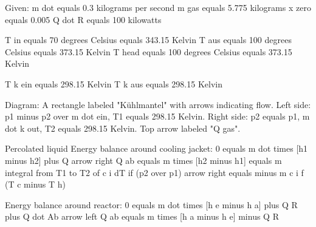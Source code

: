 Given:  
m dot equals 0.3 kilograms per second  
m gas equals 5.775 kilograms  
x zero equals 0.005  
Q dot R equals 100 kilowatts  

T in equals 70 degrees Celsius equals 343.15 Kelvin  
T aus equals 100 degrees Celsius equals 373.15 Kelvin  
T head equals 100 degrees Celsius equals 373.15 Kelvin  

T k ein equals 298.15 Kelvin  
T k aus equals 298.15 Kelvin  

Diagram:  
A rectangle labeled "Kühlmantel" with arrows indicating flow.  
Left side: p1 minus p2 over m dot ein, T1 equals 298.15 Kelvin.  
Right side: p2 equals p1, m dot k out, T2 equals 298.15 Kelvin.  
Top arrow labeled "Q gas".  

Percolated liquid  
Energy balance around cooling jacket:  
0 equals m dot times [h1 minus h2] plus Q arrow right  
Q ab equals m times [h2 minus h1]  
equals m integral from T1 to T2 of c i dT if (p2 over p1) arrow right  
equals minus m c i f (T c minus T h)  

Energy balance around reactor:  
0 equals m dot times [h e minus h a] plus Q R plus Q dot Ab arrow left  
Q ab equals m times [h a minus h e] minus Q R